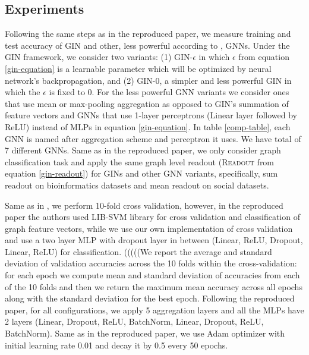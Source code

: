 \documentclass{article} %
\begin{document}
\subsection{Experiments}
Following the same steps as in the reproduced paper, we measure training and test accuracy of GIN and other, less powerful according to \cite{ThePaper}, GNNs. Under the GIN framework, we consider two variants: (1) GIN-$\epsilon$ in which $\epsilon$ from equation \ref{gin-equation} is a learnable parameter which will be optimized by neural network's backpropagation, and (2) GIN-0, a simpler and less powerful GIN in which the $\epsilon$ is fixed to $0$. For the less powerful GNN variants we consider ones that use mean or max-pooling aggregation as opposed to GIN's summation of feature vectors and GNNs that use 1-layer perceptrons (Linear layer followed by ReLU) instead of MLPs in equation \ref{gin-equation}. In table \ref{comp-table}, each GNN is named after aggregation scheme and perceptron it uses. We have total of 7 different GNNs. Same as in the reproduced paper, we only consider graph classification task and apply the same graph level readout (\textsc{Readout} from equation \ref{gin-readout}) for GINs and other GNN variants, specifically, sum readout on bioinformatics datasets and mean readout on social datasets.

Same as in \cite{ThePaper}, we perform 10-fold cross validation, however, in the reproduced paper the authors used LIB-SVM library for cross validation and classification of graph feature vectors, while we use our own implementation of cross validation and use a two layer MLP with dropout layer in between (Linear, ReLU, Dropout, Linear, ReLU) for classification. (((((We report the average and standard deviation of validation accuracies across the 10 folds within the cross-validation: for each epoch we compute mean and standard deviation of accuracies from each of the 10 folds and then we return the maximum mean accuracy across all epochs along with the standard deviation for the best epoch. Following the reproduced paper, for all configurations, we apply 5 aggregation layers and all the MLPs have 2 layers (Linear, Dropout, ReLU, BatchNorm, Linear, Dropout, ReLU, BatchNorm). Same as in the reproduced paper, we use Adam optimizer with initial learning rate 0.01 and decay it by 0.5 every 50 epochs. 
\end{document}
